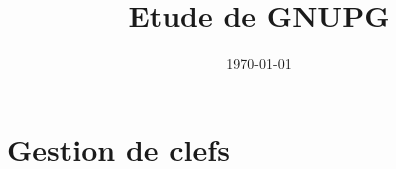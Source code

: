 \documentclass{../res/univ-projet}
\title{Etude de GNUPG}
\author{}
\date{\today}
\begin{document}
\maketitle
\newpage
\tableofcontents
\newpage


\section{Gestion de clefs}
  
  
  
\end{document}
